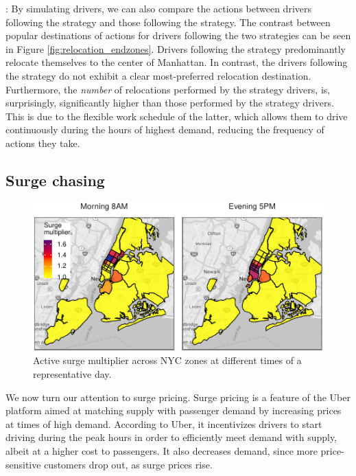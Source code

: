 : By simulating drivers, we can also compare the {\relocate} actions between drivers 
following the {\relocation} strategy and those following the {\relocationflexible} strategy. 
The contrast between popular destinations 
of {\relocate} actions for drivers following the two strategies can be seen in Figure \ref{fig:relocation_endzones}. 
Drivers following the {\relocation} strategy predominantly relocate themselves to the center of Manhattan. In contrast, the drivers following the {\relocationflexible} strategy do not exhibit a clear most-preferred relocation destination. Furthermore, the 
{\em number} of relocations performed by the {\relocation} strategy drivers, 
is, surprisingly, significantly higher than those performed by the {\relocationflexible} strategy drivers. 
This is due to the flexible work schedule of the latter, which allows them to drive 
  continuously during the hours of highest demand, reducing the frequency of {\relocate} actions they take. 

\subsection{Surge chasing}
\begin{figure}
	\centering
	\includegraphics{figures/surge_heatmap.pdf}
	\setlength{\belowcaptionskip}{-10pt}
	\caption{Active surge multiplier across NYC zones at different times of a representative day.}
	\label{fig:surge_heatmap}
\end{figure}

We now turn our attention to surge pricing. Surge pricing is a 
feature of the Uber platform
aimed at matching supply with passenger demand by increasing prices at times of high demand.%
According to Uber, it incentivizes drivers to start driving during the peak hours in order to efficiently meet demand with 
  supply, albeit at a higher cost to passengers.
It also decreases demand, since more price-sensitive customers drop out, as surge prices rise.

